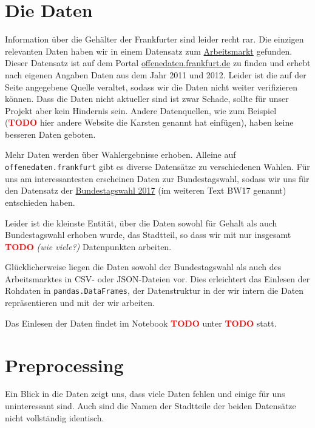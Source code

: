 \documentclass[a4paper,10pt]{scrartcl}
\newcommand{\TODO}{\textcolor{red}{\textbf{TODO }}}
\begin{document}
\section{Die Daten}
Information über die Gehälter der Frankfurter sind leider recht rar. Die einzigen relevanten Daten haben wir in einem Datensatz zum  \href{https://offenedaten.frankfurt.de/dataset/arbeitsmarkt}{Arbeitsmarkt}
gefunden. Dieser Datensatz ist auf dem Portal \href{https://offenedaten.frankfurt.de}{offenedaten.frankfurt.de} zu finden und erhebt nach eigenen Angaben Daten aus dem Jahr 2011 und 2012. Leider ist die auf der Seite angegebene Quelle veraltet, sodass wir die Daten nicht weiter verifizieren können. Dass die Daten nicht aktueller sind ist zwar Schade, sollte für unser Projekt aber kein Hindernis sein.  Andere Datenquellen, wie zum Beispiel (\TODO hier andere Website die Karsten genannt hat einfügen), haben keine besseren Daten geboten.

Mehr Daten werden über Wahlergebnisse erhoben. Alleine auf \lstinline|offenedaten.frankfurt| gibt es diverse Datensätze zu verschiedenen Wahlen. Für uns am interessantesten erscheinen Daten zur Bundestagswahl, sodass wir uns für den Datensatz der \href{https://offenedaten.frankfurt.de/dataset/bundestagswahl-2017-ergebnisse-in-frankfurt-am-main}{Bundestagswahl 2017} (im weiteren Text BW17 genannt) entschieden haben.

Leider ist die kleinste Entität, über die Daten sowohl für Gehalt als auch Bundestagswahl erhoben wurde, das Stadtteil, so dass wir mit nur insgesamt \TODO\emph{(wie viele?)} Datenpunkten arbeiten.

Glücklicherweise liegen die Daten sowohl der Bundestagswahl als auch des Arbeitsmarktes in CSV- oder JSON-Dateien vor. Dies erleichtert das Einlesen der Rohdaten in \lstinline|pandas.DataFrames|, der Datenstruktur in der wir intern die Daten repräsentieren und mit der wir arbeiten.

Das Einlesen der Daten findet im Notebook \TODO unter \TODO statt.


\section{Preprocessing}
Ein Blick in die Daten zeigt uns, dass viele Daten fehlen und einige für uns uninteressant sind. Auch sind die Namen der Stadtteile der beiden Datensätze nicht vollständig identisch.
\end{document}
